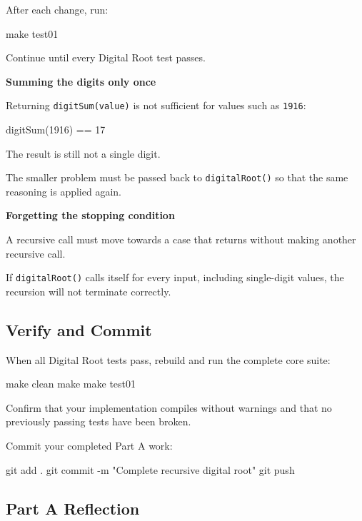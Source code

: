 \documentclass{csc2059practical}
\begin{document}
After each change, run:

\begin{terminal}
make test01
\end{terminal}

Continue until every Digital Root test passes.

\begin{commonerror}
\textbf{Summing the digits only once}

Returning \texttt{digitSum(value)} is not sufficient for values such as
\texttt{1916}:

\begin{cppcode}
digitSum(1916) == 17
\end{cppcode}

The result is still not a single digit.

The smaller problem must be passed back to \texttt{digitalRoot()} so
that the same reasoning is applied again.
\end{commonerror}

\begin{commonerror}
\textbf{Forgetting the stopping condition}

A recursive call must move towards a case that returns without making another
recursive call.

If \texttt{digitalRoot()} calls itself for every input, including
single-digit values, the recursion will not terminate correctly.
\end{commonerror}

\subsection{Verify and Commit}

When all Digital Root tests pass, rebuild and run the complete core suite:

\begin{terminal}
make clean
make
make test01
\end{terminal}

Confirm that your implementation compiles without warnings and that no
previously passing tests have been broken.

Commit your completed Part A work:

\begin{terminal}
git add .
git commit -m "Complete recursive digital root"
git push
\end{terminal}

\subsection{Part A Reflection}
\end{document}

